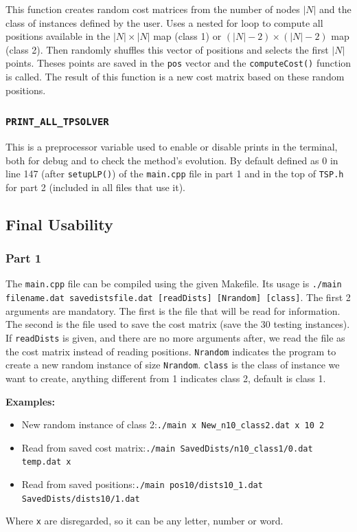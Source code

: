 \documentclass[a4paper,12pt]{article}
\begin{document}
				This function creates random cost matrices from the number of nodes $ |N| $ and the class of instances defined by the user.
				Uses a nested for loop to compute all positions available in the $ |N| \times |N|  $ map (class 1) or $ (|N|-2) \times (|N|-2)  $  map (class 2).
				Then randomly shuffles this vector of positions and selects the first $ |N| $ points.
				Theses points are saved in the \texttt{pos} vector and the \texttt{computeCost()} function is called.
				The result of this function is a new cost matrix based on these random positions.
			
			\subsubsection{\texttt{PRINT\_ALL\_TPSOLVER}}
				This is a preprocessor variable used to enable or disable prints in the terminal, both for debug and to check the method's evolution.
				By default defined as $ 0 $ in line 147 (after \texttt{setupLP()}) of the \texttt{main.cpp} file in part 1 and in the top of \texttt{TSP.h} for part 2 (included in all files that use it).
				
		\subsection{Final Usability}
			\subsubsection{Part 1}
				The \texttt{main.cpp} file can be compiled using the given Makefile.
				Its usage is \texttt{./main filename.dat savedistsfile.dat [readDists] [Nrandom] [class]}.
				The first 2 arguments are mandatory. 
				The first is the file that will be read for information.
				The second is the file used to save the cost matrix (save the 30 testing instances).
				If \texttt{readDists} is given, and there are no more arguments after, we read the file as the cost matrix instead of reading positions.
				\texttt{Nrandom} indicates the program to create a new random instance of size \texttt{Nrandom}.
				\texttt{class} is the class of instance we want to create, anything different from 1 indicates class 2, default is class 1.
				
				\textbf{Examples:}
				\begin{itemize}
					\item New random instance of class 2:\texttt{./main x New\_n10\_class2.dat x 10 2}
					\item Read from saved cost matrix:\texttt{./main SavedDists/n10\_class1/0.dat temp.dat x}
					\item Read from saved positions:\texttt{./main pos10/dists10\_1.dat SavedDists/dists10/1.dat}
				\end{itemize}
				Where \texttt{x} are disregarded, so it can be any letter, number or word.
							
\end{document}
